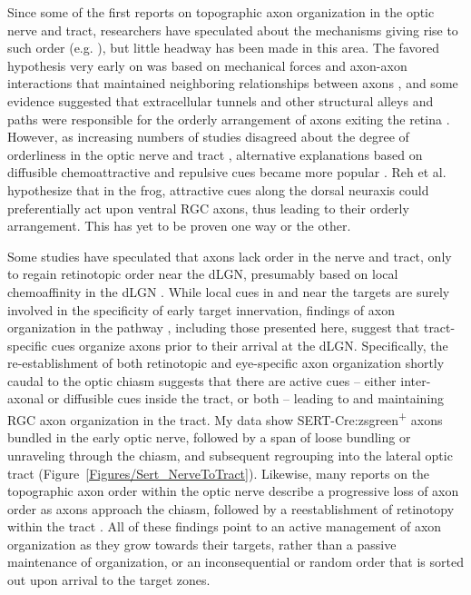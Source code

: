Since some of the first reports on topographic axon organization in the optic nerve and tract, researchers have speculated about the mechanisms giving rise to such order (e.g. ), but little headway has been made in this area.
The favored hypothesis very early on was based on mechanical forces and axon-axon interactions that maintained neighboring relationships between axons \cite{cook1977multiple}, and some evidence suggested that extracellular tunnels and other structural alleys and paths were responsible for the orderly arrangement of axons exiting the retina \cite{silver1980mechanism}.
However, as increasing numbers of studies disagreed about the degree of orderliness in the optic nerve and tract \cite{martin1983role}, alternative explanations based on diffusible chemoattractive and repulsive cues became more popular \cite{reh1983organization}.
Reh et al.  hypothesize that in the frog, attractive cues along the dorsal neuraxis could preferentially act upon ventral RGC axons, thus leading to their orderly arrangement.
This has yet to be proven one way or the other.

Some studies have speculated that axons lack order in the nerve and tract, only to regain retinotopic order near the dLGN, presumably based on local chemoaffinity in the dLGN \cite{horton1979non}.
While local cues in and near the targets are surely involved in the specificity of early target innervation, findings of axon organization in the pathway \cite{martin1983role,chan1999changes,chan1994changes,plas2005pretarget,reese1993reestablishment}, including those presented here, suggest that tract-specific cues organize axons prior to their arrival at the dLGN.
Specifically, the re-establishment of both retinotopic and eye-specific axon organization shortly caudal to the optic chiasm suggests that there are active cues -- either inter-axonal or diffusible cues inside the tract, or both -- leading to and maintaining RGC axon organization in the tract.
My data show SERT-Cre:zsgreen\textsuperscript{+} axons bundled in the early optic nerve, followed by a span of loose bundling or unraveling through the chiasm, and subsequent regrouping into the lateral optic tract (Figure~\ref{Figures/Sert_NerveToTract}).
Likewise, many reports on the topographic axon order within the optic nerve describe a progressive loss of axon order as axons approach the chiasm, followed by a reestablishment of retinotopy within the tract \cite{chan1999changes,plas2005pretarget,chan1994changes,simon1991relationship,reese1993reestablishment,horton1979non,naito1986course,naito1994retinogeniculate,colello1998changing,montgomery1998organization,ehrlich1984course}. 
All of these findings point to an active management of axon organization as they grow towards their targets, rather than a passive maintenance of organization, or an inconsequential or random order that is sorted out upon arrival to the target zones.

